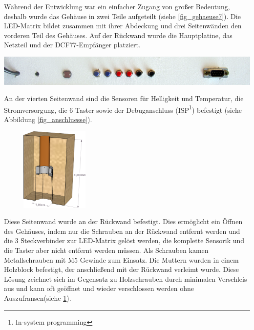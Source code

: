 Während der Entwicklung war ein einfacher Zugang von großer Bedeutung, deshalb
wurde das Gehäuse in zwei Teile aufgeteilt (siehe \ref{fig_gehaeuse7}). Die
LED-Matrix bildet zusammen mit ihrer Abdeckung und drei Seitenwänden den vorderen Teil des Gehäuses. Auf der Rückwand wurde die Hauptplatine, das Netzteil und der DCF77-Empfänger platziert. 
\begin{center}\includegraphics[width=\linewidth]{images/anschluesse.png}
\label{fig_anschluesse}\end{center}

An der vierten Seitenwand sind die Sensoren für Helligkeit und Temperatur, die
Stromversorgung, die 6 Taster sowie der Debuganschluss (ISP\footnote{In-system
programming}) befestigt (siehe Abbildung \ref{fig_anschluesse}).
\begin{figure}
\begin{center}
\includegraphics[width=0.3\textwidth]{skizzen/mutter_klotz.png}
\label{mutterklotz}
\end{center}
\end{figure}
 Diese
Seitenwand wurde an der Rückwand befestigt. Dies ermöglicht ein Öffnen des
Gehäuses, indem nur die Schrauben an der Rückwand entfernt werden und die 3
Steckverbinder zur LED-Matrix gelöst werden, die komplette Sensorik und die
Taster aber nicht entfernt werden müssen.
Als Schrauben kamen Metallschrauben mit M5 
Gewinde zum Einsatz. Die Muttern wurden in einem Holzblock befestigt, der anschließend mit der Rückwand verleimt wurde.
Diese Lösung zeichnet sich im Gegensatz zu Holzschrauben durch minimalen
Verschleis aus und kann oft geöffnet und wieder verschlossen werden ohne
Auszufransen(siehe \ref{mutterklotz}).

